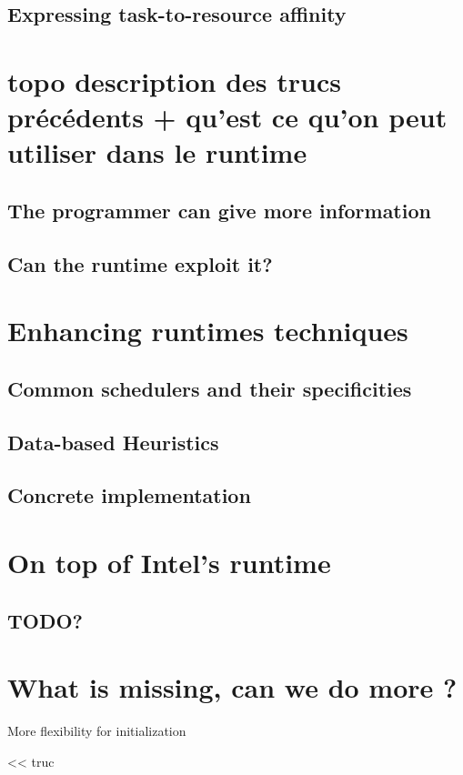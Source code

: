 \subsection{Expressing task-to-resource affinity}

\section{topo description des trucs précédents + qu'est ce qu'on peut utiliser dans le runtime}
\subsection{The programmer can give more information}
\subsection{Can the runtime exploit it?}

\section{Enhancing runtimes techniques}
\subsection{Common schedulers and their specificities}
\subsection{Data-based Heuristics}
\subsection{Concrete implementation}

\section{On top of Intel's runtime}
\subsection{TODO?}

\section{What is missing, can we do more ?}
More flexibility for initialization

\begin{savequote}[6cm]
<< truc
\end{savequote}


